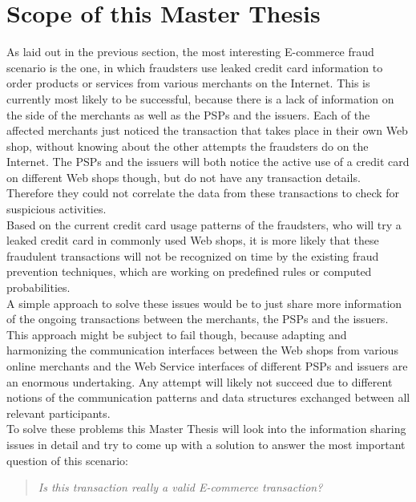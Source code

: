 
\section{Scope of this Master Thesis}
\label{sec:scope_thesis}

As laid out in the previous section, the most interesting \gls{E-commerce} fraud scenario is the one, in which fraudsters use leaked credit card information to order products or services from various merchants on the Internet. This is currently most likely to be successful, because there is a lack of information on the side of the merchants as well as the \gls{PSP}s and the issuers. Each of the affected merchants just noticed the transaction that takes place in their own Web shop, without knowing about the other attempts the fraudsters do on the Internet. The \gls{PSP}s and the issuers will both notice the active use of a credit card on different Web shops though, but do not have any transaction details. Therefore they could not correlate the data from these transactions to check for suspicious activities. \\

Based on the current credit card usage patterns of the fraudsters, who will try a leaked credit card in commonly used Web shops, it is more likely that these fraudulent transactions will not be recognized on time by the existing fraud prevention techniques, which are working on predefined rules or computed probabilities. \\

A simple approach to solve these issues would be to just share more information of the ongoing transactions between the merchants, the \gls{PSP}s and the issuers. This approach might be subject to fail though, because adapting and harmonizing the communication interfaces between the Web shops from various online merchants and the Web Service interfaces of different \gls{PSP}s and issuers are an enormous undertaking. Any attempt will likely not succeed due to different notions of the communication patterns and data structures exchanged between all relevant participants. \\

To solve these problems this Master Thesis will look into the information sharing issues in detail and try to come up with a solution to answer the most important question of this scenario: \@

\begin{quotation}
  \textit{Is this transaction really a valid \gls{E-commerce} transaction?}
\end{quotation}

